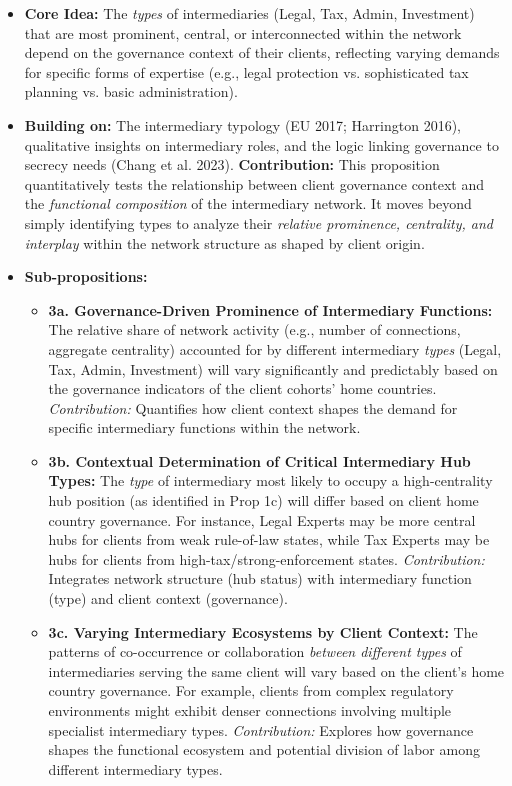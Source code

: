 \begin{itemize}[leftmargin=*]
    \item \textbf{Core Idea:} The \textit{types} of intermediaries (Legal, Tax, Admin, Investment) that are most prominent, central, or interconnected within the network depend on the governance context of their clients, reflecting varying demands for specific forms of expertise (e.g., legal protection vs. sophisticated tax planning vs. basic administration).
    \item \textbf{Building on:} The intermediary typology (EU 2017; Harrington 2016), qualitative insights on intermediary roles, and the logic linking governance to secrecy needs (Chang et al. 2023).
    \textbf{Contribution:} This proposition quantitatively tests the relationship between client governance context and the \textit{functional composition} of the intermediary network. It moves beyond simply identifying types to analyze their \textit{relative prominence, centrality, and interplay} within the network structure as shaped by client origin.
    \item \textbf{Sub-propositions:}
    \begin{itemize}[leftmargin=\parindent]
        \item \textbf{3a. Governance-Driven Prominence of Intermediary Functions:} The relative share of network activity (e.g., number of connections, aggregate centrality) accounted for by different intermediary \textit{types} (Legal, Tax, Admin, Investment) will vary significantly and predictably based on the governance indicators of the client cohorts' home countries. \textit{Contribution:} Quantifies how client context shapes the demand for specific intermediary functions within the network.
        \item \textbf{3b. Contextual Determination of Critical Intermediary Hub Types:} The \textit{type} of intermediary most likely to occupy a high-centrality hub position (as identified in Prop 1c) will differ based on client home country governance. For instance, Legal Experts may be more central hubs for clients from weak rule-of-law states, while Tax Experts may be hubs for clients from high-tax/strong-enforcement states. \textit{Contribution:} Integrates network structure (hub status) with intermediary function (type) and client context (governance).
        \item \textbf{3c. Varying Intermediary Ecosystems by Client Context:} The patterns of co-occurrence or collaboration \textit{between different types} of intermediaries serving the same client will vary based on the client's home country governance. For example, clients from complex regulatory environments might exhibit denser connections involving multiple specialist intermediary types. \textit{Contribution:} Explores how governance shapes the functional ecosystem and potential division of labor among different intermediary types.
    \end{itemize}
\end{itemize}

